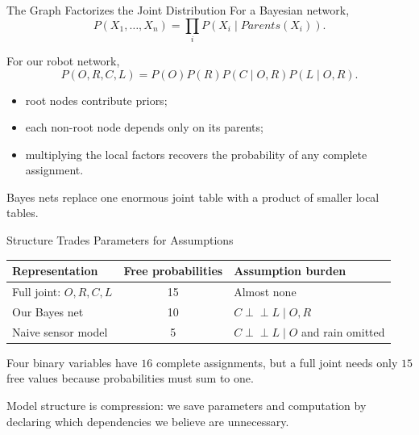 \documentclass[aspectratio=169,10pt]{beamer}
\begin{document}
\begin{frame}[shrink=10]{The Graph Factorizes the Joint Distribution}
  For a Bayesian network,
  \[
    P(X_1,\ldots,X_n)
    =
    \prod_i P(X_i\mid Parents(X_i)).
  \]

  For our robot network,
  \[
    P(O,R,C,L)
    =
    P(O)P(R)P(C\mid O,R)P(L\mid O,R).
  \]

  \begin{itemize}
    \item root nodes contribute priors;
    \item each non-root node depends only on its parents;
    \item multiplying the local factors recovers the probability of any complete assignment.
  \end{itemize}

  \begin{keyidea}
    Bayes nets replace one enormous joint table with a product of smaller local tables.
  \end{keyidea}
\end{frame}

\begin{frame}[shrink=10]{Structure Trades Parameters for Assumptions}
  \begin{center}
  \renewcommand{\arraystretch}{1.35}
  \begin{tabular}{l|c|p{}}
    \textbf{Representation} & \textbf{Free probabilities} & \textbf{Assumption burden} \\\hline
    Full joint: $O,R,C,L$ & 15 & Almost none \\
    Our Bayes net & 10 & $C\perp\!\!\!\perp L\mid O,R$ \\
    Naive sensor model & 5 & $C\perp\!\!\!\perp L\mid O$ and rain omitted \\
  \end{tabular}
  \end{center}

  Four binary variables have $16$ complete assignments, but a full joint needs only $15$ free values because probabilities must sum to one.

  \begin{keyidea}
    Model structure is compression: we save parameters and computation by declaring which dependencies we believe are unnecessary.
  \end{keyidea}
\end{frame}
\end{document}
